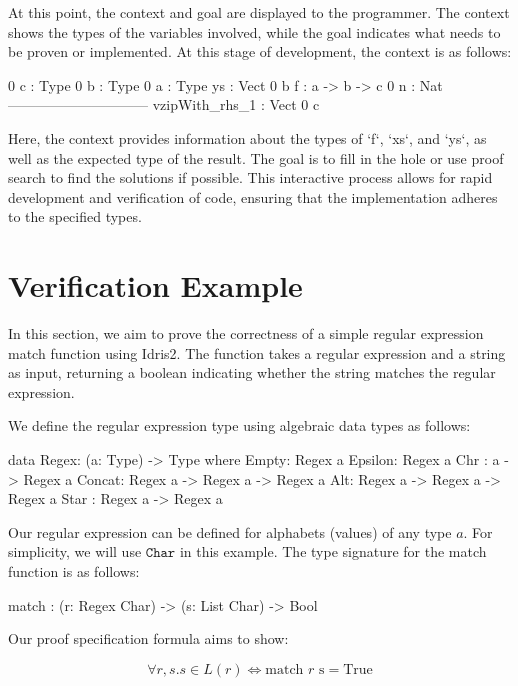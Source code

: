 \documentclass[]{rptuseminar}
\begin{document}
At this point, the context and goal are displayed to the programmer. The context shows the types of the variables involved, while the goal indicates what needs to be proven or implemented. At this stage of development, the context is as follows:

\begin{idris}
 0 c : Type
 0 b : Type
 0 a : Type
   ys : Vect 0 b
   f : a -> b -> c
 0 n : Nat
------------------------------
vzipWith_rhs_1 : Vect 0 c
\end{idris}

Here, the context provides information about the types of `f`, `xs`, and `ys`, as well as the expected type of the result. The goal is to fill in the hole or use proof search to find the solutions if possible. This interactive process allows for rapid development and verification of code, ensuring that the implementation adheres to the specified types.

\section{Verification Example}  
\label{sec:verification-example}  

In this section, we aim to prove the correctness of a simple regular expression match function using Idris2. The function takes a regular expression and a string as input, returning a boolean indicating whether the string matches the regular expression.

We define the regular expression type using algebraic data types as follows:

\begin{idris}
data Regex: (a: Type) -> Type where
  Empty: Regex a
  Epsilon: Regex a
  Chr : a -> Regex a
  Concat: Regex a -> Regex a -> Regex a
  Alt:  Regex a -> Regex a -> Regex a
  Star :  Regex a -> Regex a
\end{idris}

Our regular expression can be defined for alphabets (values) of any type \( a \). For simplicity, we will use \( \texttt{Char} \) in this example. The type signature for the match function is as follows:

\begin{idris}
match : (r: Regex Char) -> (s: List Char) -> Bool
\end{idris}

Our proof specification formula aims to show:

\begin{equation}
\forall r, s. s \in L(r) \Leftrightarrow \text{match } r \text{ s} = \text{True}
\end{equation}
\end{document}
